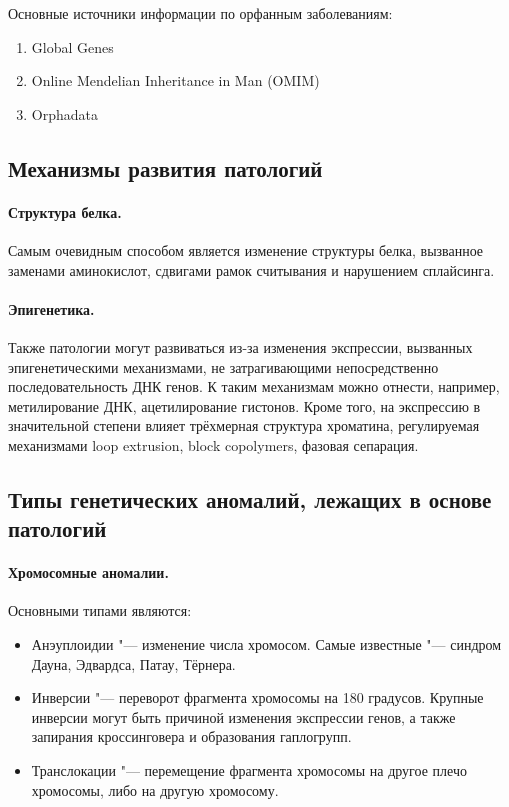 \documentclass[a4paper,12pt]{article}
\begin{document}
Основные источники информации по орфанным заболеваниям:

\begin{enumerate}
\item Global Genes
\item Online Mendelian Inheritance in Man (OMIM)\cite{omim}
\item Orphadata
\end{enumerate}

\subsection{Механизмы развития патологий}

\paragraph{Структура белка.}
Самым очевидным способом является изменение структуры белка, вызванное заменами аминокислот, сдвигами рамок считывания и нарушением сплайсинга.

\paragraph{Эпигенетика.}
Также патологии могут развиваться из-за изменения экспрессии, вызванных эпигенетическими механизмами, не затрагивающими непосредственно последовательность ДНК генов.
К таким механизмам можно отнести, например, метилирование ДНК, ацетилирование гистонов.
Кроме того, на экспрессию в значительной степени влияет трёхмерная структура хроматина, регулируемая механизмами loop extrusion, block copolymers, фазовая сепарация.

\subsection{Типы генетических аномалий, лежащих в основе патологий}

\paragraph{Хромосомные аномалии.}
Основными типами являются:
\begin{itemize}
\item Анэуплоидии "--- изменение числа хромосом.
Самые известные "--- синдром Дауна, Эдвардса, Патау, Тёрнера.
\item Инверсии "--- переворот фрагмента хромосомы на 180 градусов.
Крупные инверсии могут быть причиной изменения экспрессии генов, а также запирания кроссинговера и образования гаплогрупп.
\item Транслокации "--- перемещение фрагмента хромосомы на другое плечо хромосомы, либо на другую хромосому.
\end{itemize}
\end{document}

